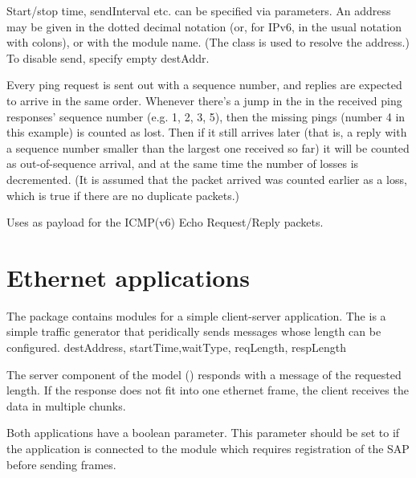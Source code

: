 Start/stop time, sendInterval etc. can be specified via parameters. An address
may be given in the dotted decimal notation (or, for IPv6, in the usual
notation with colons), or with the module name.
(The  class is used to resolve the address.)
To disable send, specify empty destAddr.

Every ping request is sent out with a sequence number, and replies are
expected to arrive in the same order. Whenever there's a jump in the
in the received ping responses' sequence number (e.g. 1, 2, 3, 5), then
the missing pings (number 4 in this example) is counted as lost.
Then if it still arrives later (that is, a reply with a sequence number
smaller than the largest one received so far) it will be counted as
out-of-sequence arrival, and at the same time the number of losses is
decremented. (It is assumed that the packet arrived was counted earlier as a loss,
which is true if there are no duplicate packets.)

Uses  as payload for the ICMP(v6) Echo Request/Reply packets.


\section{Ethernet applications}

The  package contains modules
for a simple client-server application. The  is a simple
traffic generator that peridically sends  messages
whose length can be configured. destAddress, startTime,waitType, reqLength, respLength

The server component of the model () responds with a
 message of the requested length. If the response does
not fit into one ethernet frame, the client receives the data in multiple
chunks.


Both applications have a  boolean parameter.
This parameter should be set to  if the application is connected
to the  module which requires registration of the SAP
before sending frames.

